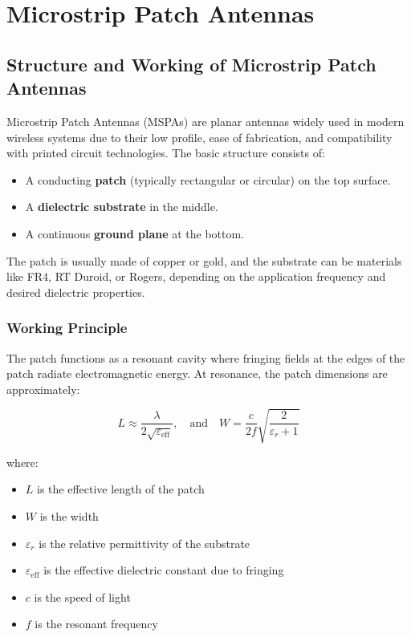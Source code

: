 \chapter{Microstrip Patch Antennas}

\section{Structure and Working of Microstrip Patch Antennas}

Microstrip Patch Antennas (MSPAs) are planar antennas widely used in modern wireless systems due to their low profile, ease of fabrication, and compatibility with printed circuit technologies. The basic structure consists of:

\begin{itemize}
    \item A conducting \textbf{patch} (typically rectangular or circular) on the top surface.
    \item A \textbf{dielectric substrate} in the middle.
    \item A continuous \textbf{ground plane} at the bottom.
\end{itemize}

The patch is usually made of copper or gold, and the substrate can be materials like FR4, RT Duroid, or Rogers, depending on the application frequency and desired dielectric properties.

\subsection*{Working Principle}

The patch functions as a resonant cavity where fringing fields at the edges of the patch radiate electromagnetic energy. At resonance, the patch dimensions are approximately:

\[
L \approx \frac{\lambda}{2\sqrt{\varepsilon_{\text{eff}}}}, \quad \text{and} \quad W = \frac{c}{2f}\sqrt{\frac{2}{\varepsilon_r + 1}}
\]

where:
\begin{itemize}
    \item $L$ is the effective length of the patch
    \item $W$ is the width
    \item $\varepsilon_r$ is the relative permittivity of the substrate
    \item $\varepsilon_{\text{eff}}$ is the effective dielectric constant due to fringing
    \item $c$ is the speed of light
    \item $f$ is the resonant frequency
\end{itemize}

